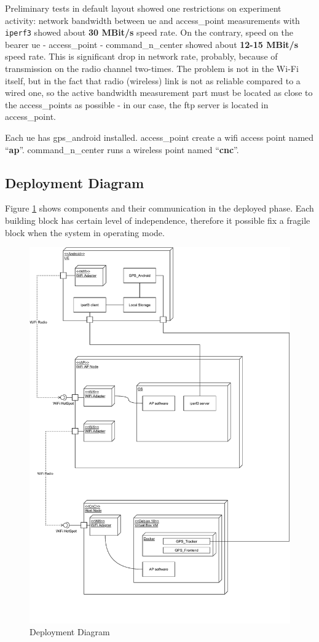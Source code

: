 Preliminary tests in default layout showed one restrictions on experiment activity: network bandwidth
between \gls{ue} and \gls{access_point} measurements with \texttt{iperf3} showed about \textbf{30 MBit/s} speed rate. On the contrary, speed on the bearer \gls{ue} - \gls{access_point} - \gls{command_n_center} showed about \textbf{12-15 MBit/s} speed rate. This is significant drop in network rate, probably, because of transmission on the radio channel two-times. The problem  is not in the Wi-Fi itself, but in the fact that radio (wireless) link is not as reliable compared to a wired one, so the active bandwidth measurement part must be located as close to the \glspl{access_point} as possible - in our case, the \acrshort{ftp} server is located in \gls{access_point}.

Each \gls{ue} has   \gls{gps_android} installed. \Gls{access_point} create a \gls{wifi} access point named ``\textbf{ap}''.
\Gls{command_n_center} runs a wireless point named
``\textbf{cnc}''.

\subsection{Deployment Diagram}\label{deployment-diagram}

Figure \ref{fig:deployment-diagram} shows components and their communication in the deployed phase. Each building block has certain level of independence, therefore it possible fix a fragile block when the system in operating mode.

\begin{figure}[H]
	\centering
	\includegraphics[width=0.8\linewidth, keepaspectratio]{images/Deployment Diagram-Deployment_Diagram.pdf}
	\caption{Deployment Diagram}
	\label{fig:deployment-diagram}
\end{figure}

